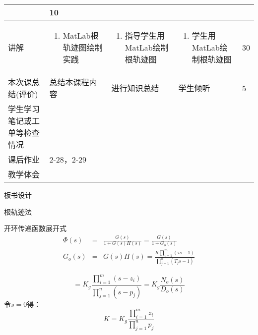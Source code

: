 {\begin{landscape}
\begin{longtable}{|m{10mm}|m{50mm}|m{50mm}|m{50mm}|m{15mm}|}
\begin{enumerate}
\end{enumerate} &10 \\\hline
讲解&\begin{enumerate}
\item MatLab根轨迹图绘制实践
\end{enumerate}
 &\begin{enumerate}
\item 指导学生用MatLab绘制根轨迹图
\end{enumerate} &\begin{enumerate}
\item 学生用MatLab绘制根轨迹图
\end{enumerate} &30 \\\hline

\centering 本次课总结(评价)&总结本课程内容 &进行知识总结 &学生倾听 &5 \\\hline
\centering 学生学习笔记或工单等检查情况&\multicolumn{4}{m{165mm}|}{\quad}\\\hline
\centering 课后作业&\multicolumn{4}{m{165mm}|}{2-28，2-29}\\\hline
\centering 教学体会&\multicolumn{4}{m{165mm}|}{\quad}\\
\end{longtable}

\end{landscape}
\clearpage
\begin{center}
{\huge 板书设计}
\end{center}
}
 \begin{frame}{根轨迹法} 
 \begin{block}{开环传递函数展开式}
 \begin{eqnarray*}
 \Phi(s)&=&\frac{G(s)}{1+G(s)H(s)}=\frac{G(s)}{1+G_o(s)}\\
 G_o(s)&=&G(s)H(s)=\frac{K\prod\limits_{i=1}^m(\tau s-1)}{\prod\limits_{j=1}^{n}(T_js-1)}
 \end{eqnarray*}
 \end{block}
 \end{frame}
 \begin{frame}
 \begin{block}{}
 \[=K_g\frac{\prod\limits_{i=1}^m(s-z_i)}{\prod\limits_{j=1}^{n}(s-p_j)}=K_g\frac{N_o(s)}{D_o(s)}\]
 令$s=0$得：
 \[K=K_g\frac{\prod\limits_{i=1}^mz_i}{\prod\limits_{j=1}^np_j}\]
 \end{block}
 \end{frame}
 
